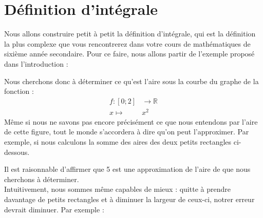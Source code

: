 \documentclass[a4paper,fontsize=13pt]{scrreprt}
\theoremstyle{plain}
\theoremstyle{definition}
\newcommand{\rr}{\mathbb{R}}
\newcommand {\grille}{\draw[help lines] (\xmin,\ymin) grid (\xmax,\ymax);}
\newcommand {\axes} {
	\draw[thick, ->] (\xmin,0) -- (\xmax+1,0);
	\draw[thick, ->] (0,\ymin) -- (0,\ymax+1);
	\draw (0,\ymax+0.5) node [left] {$y$};
	\draw (\xmax+0.5, 0) node [below] {$x$};
	\draw[thick] (-0.15,1)--(0.15,1) (1,-0.15)--(1,0.15);
	\draw (0,1)node[left]{$1$} (1,0)node[below]{$1$};
}
\begin{document}
\chapter{Définition d'intégrale}

Nous allons construire petit à petit la définition d'intégrale, qui est la définition la plus complexe que vous rencontrerez dans votre cours de mathématiques de sixième année secondaire. Pour ce faire, nous allons partir de l'exemple proposé dans l'introduction :
\begin{center}
\end{center}
Nous cherchons donc à déterminer ce qu'est \og l'aire \fg{} sous la courbe du graphe de la fonction :
\begin{align*}
f : [0;2] & \to \rr \\
x \mapsto& x^2
\end{align*}
Même si nous ne savons pas encore précisément ce que nous entendons par l'aire de cette figure, tout le monde s'accordera à dire qu'on peut l'approximer. Par exemple, si nous calculons la somme des aires des deux petits rectangles ci-dessous.
\begin{center}
\end{center}
Il est raisonnable d'affirmer que 5 est une approximation de l'aire de que nous cherchons à déterminer. \\
Intuitivement, nous sommes même capables de mieux : quitte à prendre davantage de petits rectangles et à diminuer la largeur de ceux-ci, notrer erreur devrait diminuer. Par exemple :
\end{document}
